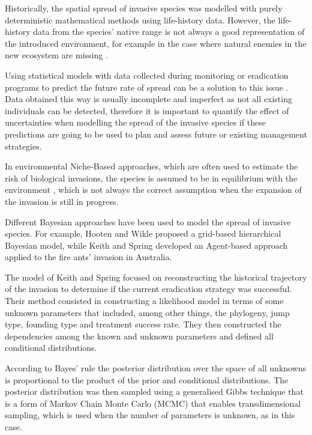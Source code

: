 \documentclass[11pt,a4paper]{article}
\begin{document}
Historically, the spatial spread of invasive species was modelled with purely deterministic mathematical methods using life-history data. However, the life-history data from the species' native range is not always a good representation of the introduced environment, for example in the case where natural enemies in the new ecosystem are missing \cite{Broennimann}. 

Using statistical models with data collected during monitoring or eradication programs to predict the future rate of spread can be a solution to this issue \cite{Hastings}. Data obtained this way is usually incomplete and imperfect as not all existing individuals can be detected, therefore it is important to quantify the effect of uncertainties when modelling the spread of the invasive species if these predictions are going to be used to plan and assess future or existing management strategies. 

In environmental Niche-Based approaches, which are often used to estimate the risk of biological invasions, the species is assumed to be in equilibrium with the environment \cite{Veloz}, which is not always the correct assumption when the expansion of the invasion is still in progress.

Different Bayesian approaches have been used to model the spread of invasive species. For example, Hooten and Wikle \cite{Hooten} proposed a grid-based hierarchical Bayesian model, while Keith and Spring \cite{Keith} developed an Agent-based approach applied to the fire ants’ invasion in Australia. %

The model of Keith and Spring focused on reconstructing the historical trajectory of the invasion to determine if the current eradication strategy was successful. Their method consisted in constructing a likelihood model in terms of some unknown parameters that included, among other things, the phylogeny, jump type, founding type and treatment success rate. They then constructed the dependencies among the known and unknown parameters and defined all conditional distributions. 

According to Bayes' rule the posterior distribution over the space of all unknowns is proportional to the product of the prior and conditional distributions. The posterior distribution was then sampled using a generalised Gibbs technique that is a form of Markov Chain Monte Carlo (MCMC) that enables transdimensional sampling, which is used when the number of parameters is unknown, as in this case.
\end{document}

